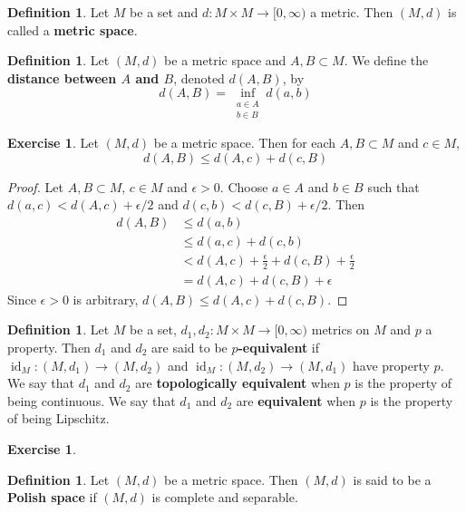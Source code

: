 \documentclass[12pt]{amsart}
\theoremstyle{definition}
\newtheorem{defn}[definition]{Definition}
\newtheorem{ex}[definition]{Exercise}
\newcommand{\ep}{\epsilon}
\newcommand{\Rg}{[0,\infty)}
\DeclareMathOperator{\id}{id}
\begin{document}
	\begin{defn}
	Let $M$ be a set and $d: M \times M \rightarrow \Rg$ a metric. Then $(M, d)$ is called a \textbf{metric space}.
	\end{defn}	
	
	\begin{defn}
	Let $(M,d)$ be a metric space and $A,B \subset M$. We define the \textbf{distance between $A$ and $B$}, denoted $d(A,B)$, by $$d(A,B) = \inf_{\substack{a \in A \\ b \in B}} d(a,b)$$
	\end{defn}
	
	\begin{ex}
	Let $(M,d)$ be a metric space. Then for each $A,B \subset M$ and $c \in M$, $$d(A,B) \leq d(A,c) + d(c, B)$$
	\end{ex}
	
	\begin{proof}
	Let $A,B \subset M$, $c \in M$ and $\ep>0$. Choose $a \in A$ and $b \in B$ such that $d(a,c) < d(A,c)+ \ep/2$ and  $d(c,b) < d(c,B)+ \ep/2$. Then 
	\begin{align*}
	d(A,B) 
	&\leq d(a,b) \\
	&\leq d(a,c) + d(c,b) \\
	&< d(A,c) + \frac{\ep}{2} + d(c,B) + \frac{\ep}{2} \\
	&= d(A,c) + d(c,B) + \ep
	\end{align*}
	Since $\ep >0$ is arbitrary, $d(A,B) \leq d(A,c) + d(c,B)$.
	\end{proof}
	
	\begin{defn}
	Let $M$ be a set, $d_1, d_2: M \times M \rightarrow \Rg$ metrics on $M$ and $p$ a property. Then $d_1$ and $d_2$ are said to be \textbf{$p$-equivalent} if $\id_M: (M, d_1) \rightarrow (M, d_2)$ and $\id_M: (M, d_2) \rightarrow (M, d_1)$ have property $p$. We say that $d_1$ and $d_2$ are \textbf{topologically equivalent} when $p$ is the property of being continuous. We say that $d_1$ and $d_2$ are \textbf{equivalent} when $p$ is the property of being Lipschitz.
	\end{defn}	
	
	\begin{ex}
	
	\end{ex}
	
	
	\begin{defn}
	Let $(M,d)$ be a metric space. Then $(M,d)$ is said to be a \textbf{Polish space} if $(M,d)$ is complete and separable. 
	\end{defn}
	
\end{document}
